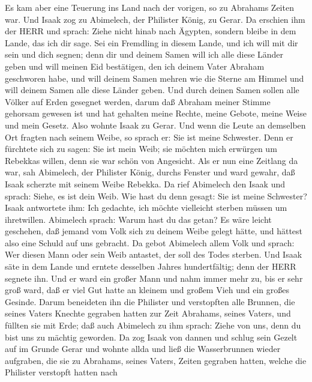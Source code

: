  Es kam aber eine Teuerung ins Land nach der vorigen, so zu
Abrahams Zeiten war. Und Isaak zog zu Abimelech, der Philister König, zu
Gerar.  Da erschien ihm der HERR und sprach: Ziehe nicht
hinab nach Ägypten, sondern bleibe in dem Lande, das ich dir sage.
 Sei ein Fremdling in diesem Lande, und ich will mit dir
sein und dich segnen; denn dir und deinem Samen will ich alle diese
Länder geben und will meinen Eid bestätigen, den ich deinem Vater
Abraham geschworen habe,  und will deinem Samen mehren wie
die Sterne am Himmel und will deinem Samen alle diese Länder geben. Und
durch deinen Samen sollen alle Völker auf Erden gesegnet werden,
 darum daß Abraham meiner Stimme gehorsam gewesen ist und
hat gehalten meine Rechte, meine Gebote, meine Weise und mein Gesetz.
 Also wohnte Isaak zu Gerar.  Und wenn die Leute
an demselben Ort fragten nach seinem Weibe, so sprach er: Sie ist meine
Schwester. Denn er fürchtete sich zu sagen: Sie ist mein Weib; sie
möchten mich erwürgen um Rebekkas willen, denn sie war schön von
Angesicht.  Als er nun eine Zeitlang da war, sah Abimelech,
der Philister König, durchs Fenster und ward gewahr, daß Isaak scherzte
mit seinem Weibe Rebekka.  Da rief Abimelech den Isaak und
sprach: Siehe, es ist dein Weib. Wie hast du denn gesagt: Sie ist meine
Schwester? Isaak antwortete ihm: Ich gedachte, ich möchte vielleicht
sterben müssen um ihretwillen.  Abimelech sprach: Warum
hast du das getan? Es wäre leicht geschehen, daß jemand vom Volk sich zu
deinem Weibe gelegt hätte, und hättest also eine Schuld auf uns
gebracht.  Da gebot Abimelech allem Volk und sprach: Wer
diesen Mann oder sein Weib antastet, der soll des Todes sterben.
 Und Isaak säte in dem Lande und erntete desselben Jahres
hundertfältig; denn der HERR segnete ihn.  Und er ward ein
großer Mann und nahm immer mehr zu, bis er sehr groß ward, 
daß er viel Gut hatte an kleinem und großem Vieh und ein großes Gesinde.
Darum beneideten ihn die Philister  und verstopften alle
Brunnen, die seines Vaters Knechte gegraben hatten zur Zeit Abrahams,
seines Vaters, und füllten sie mit Erde;  daß auch
Abimelech zu ihm sprach: Ziehe von uns, denn du bist uns zu mächtig
geworden.  Da zog Isaak von dannen und schlug sein Gezelt
auf im Grunde Gerar und wohnte allda  und ließ die
Wasserbrunnen wieder aufgraben, die sie zu Abrahams, seines Vaters,
Zeiten gegraben hatten, welche die Philister verstopft hatten nach
